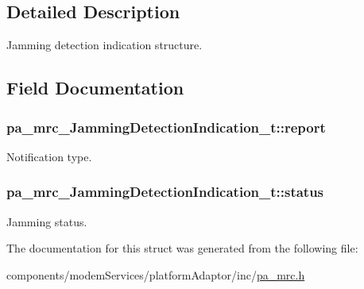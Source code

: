 \subsection{Detailed Description}
Jamming detection indication structure. 

\subsection{Field Documentation}
\subsubsection[{\texorpdfstring{report}{report}}]{ pa\+\_\+mrc\+\_\+\+Jamming\+Detection\+Indication\+\_\+t\+::report}\hypertarget{structpa__mrc___jamming_detection_indication__t_ac87a177533e06cf17ca4bcb309e784a2}{}\label{structpa__mrc___jamming_detection_indication__t_ac87a177533e06cf17ca4bcb309e784a2}


Notification type. 

\subsubsection[{\texorpdfstring{status}{status}}]{ pa\+\_\+mrc\+\_\+\+Jamming\+Detection\+Indication\+\_\+t\+::status}\hypertarget{structpa__mrc___jamming_detection_indication__t_a34bc416bc9c968faf5d2523e3f446753}{}\label{structpa__mrc___jamming_detection_indication__t_a34bc416bc9c968faf5d2523e3f446753}


Jamming status. 



The documentation for this struct was generated from the following file\+:\begin{DoxyCompactItemize}
\item 
components/modem\+Services/platform\+Adaptor/inc/\hyperlink{pa__mrc_8h}{pa\+\_\+mrc.\+h}\end{DoxyCompactItemize}
